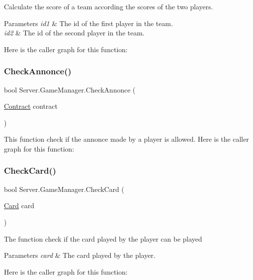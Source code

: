 Calculate the score of a team according the scores of the two players. 
\begin{DoxyParams}{Parameters}
{\em id1} & The id of the first player in the team. \\
\hline
{\em id2} & The id of the second player in the team. \\
\hline
\end{DoxyParams}
Here is the caller graph for this function\+:
\mbox{\label{class_server_1_1_game_manager_a28c391b5fd915d1f4ac422d9b4fe509e}} 
\subsubsection{\texorpdfstring{Check\+Annonce()}{CheckAnnonce()}}
{\footnotesize\ttfamily bool Server.\+Game\+Manager.\+Check\+Annonce (\begin{DoxyParamCaption}\item[{\hyperlink{class_game_1_1_contract}{Contract}}]{contract }\end{DoxyParamCaption})\hspace{0.3cm}{\ttfamily [inline]}}

This function check if the annonce made by a player is allowed. Here is the caller graph for this function\+:
\mbox{\label{class_server_1_1_game_manager_a4a32016560d748cc8c272ebfb793f22c}} 
\subsubsection{\texorpdfstring{Check\+Card()}{CheckCard()}}
{\footnotesize\ttfamily bool Server.\+Game\+Manager.\+Check\+Card (\begin{DoxyParamCaption}\item[{\hyperlink{class_game_1_1_card}{Card}}]{card }\end{DoxyParamCaption})\hspace{0.3cm}{\ttfamily [inline]}}

The function check if the card played by the player can be played 
\begin{DoxyParams}{Parameters}
{\em card} & The card played by the player. \\
\hline
\end{DoxyParams}
Here is the caller graph for this function\+:
\mbox{\label{class_server_1_1_game_manager_abe3cba330255ade16dfadbf6d2bcbed7}} 
